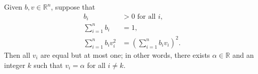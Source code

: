 \begin{lem}\label{Davids_lemma}
	Given $b,v \in \mathbb{R}^{n}$, suppose that
    \begin{subequations}\label{eq:DavidsLemma}
    		\begin{align}
    			b_i & > 0 \mbox{ for all } i, \label{eq:DavidsLemma_a} \\
    			\sum_{i=1}^n b_i & = 1, \label{eq:DavidsLemma_b} \\
    			\sum_{i=1}^n b_i v_i^2 & = \left(\sum_{i=1}^n b_i v_i \right)^2. \label{eq:DavidsLemma_c}
    		\end{align}
    	\end{subequations}
    	Then all $v_i$ are equal but at most one; in other words, there exists $\alpha \in \mathbb{R}$ and an integer $k$ such that $v_i = \alpha$ for all $i \ne k$.
\end{lem}
